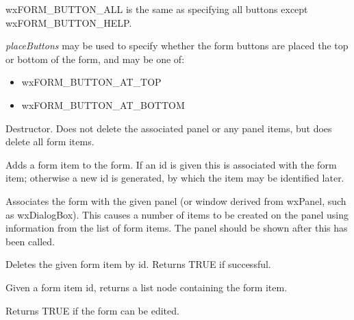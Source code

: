 wxFORM\_BUTTON\_ALL is the same as specifying all buttons except
wxFORM\_BUTTON\_HELP.

{\it placeButtons} may be used to specify whether the form buttons are
placed the top or bottom of the form, and may be one of:

\begin{itemize}\itemsep=0pt
\item wxFORM\_BUTTON\_AT\_TOP
\item wxFORM\_BUTTON\_AT\_BOTTOM
\end{itemize}



Destructor. Does not delete the associated panel or any panel items, but
does delete all form items.

\label{wxformadd}


Adds a form item to the form. If an id is given this is associated with
the form item; otherwise a new id is generated, by which the item may be
identified later.

\label{wxformassociate}


Associates the form with the given panel (or window derived from wxPanel, such as
wxDialogBox). This causes a number of items to be created on the panel
using information from the list of form items. The panel should be shown
after this has been called.



Deletes the given form item by id. Returns TRUE if successful.



Given a form item id, returns a list node containing the form item.



Returns TRUE if the form can be edited.


